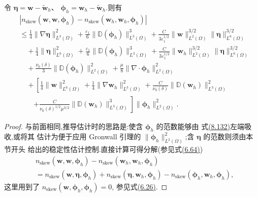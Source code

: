 \begin{lemma}[非线性对流项的估计]
\label{lem:smagorinsky-error-convective-term}
令 $\symbf{\eta}=\bm{w}-\widetilde{\bm{w}}_h$、
$\symbf{\phi}_h=\bm{w}_h-\widetilde{\bm{w}}_h$.则有
\begin{equation}\label{eq:smagorinsky-error-convection-estimate}
\begin{aligned}
&\left|n_{\mathrm{skew}}(\bm{w},\bm{w},\symbf{\phi}_h)
 -n_{\mathrm{skew}}(\bm{w}_h,\bm{w}_h,\symbf{\phi}_h)\right|\\
&\le \frac14\|\nabla\symbf{\eta}\|_{L^3(\Omega)}^2
 +\frac{\varepsilon_1}{6}
       \|\mathbb{D}(\symbf{\phi}_h)\|_{L^3(\Omega)}^3
 +\frac{C}{3\varepsilon_1^{1/2}}
       \|\bm{w}\|_{L^2(\Omega)}^{3/2}
       \|\symbf{\eta}\|_{L^6(\Omega)}^{3/2}\\
&\quad+\frac14\|\symbf{\eta}\|_{L^6(\Omega)}^2
 +\frac{\varepsilon_1}{6}
       \|\mathbb{D}(\symbf{\phi}_h)\|_{L^3(\Omega)}^3
 +\frac{C}{3\varepsilon_1^{1/2}}
       \|\bm{w}_h\|_{L^2(\Omega)}^{3/2}
       \|\symbf{\eta}\|_{L^6(\Omega)}^{3/2}\\
&\quad+\frac{\nu_0(\delta)}{3}
       \|\mathbb{D}(\symbf{\phi}_h)\|_{L^2(\Omega)}^2
 +\frac\mu8\|\nabla\cdot\symbf{\phi}_h\|_{L^2(\Omega)}^2\\
&\quad+\left[\frac14\|\bm{w}\|_{L^6(\Omega)}^2
 +\frac14\|\nabla\bm{w}_h\|_{L^3(\Omega)}^2
 +\frac{C}{\nu_0(\delta)}
       \|\mathbb{D}(\bm{w}_h)\|_{L^3(\Omega)}^2\right.\\
&\qquad\left.
 +\frac{C}{\nu_0(\delta)^{1/2}\mu^{3/2}}
       \|\mathbb{D}(\bm{w}_h)\|_{L^3(\Omega)}^3\right]
       \|\symbf{\phi}_h\|_{L^2(\Omega)}^2.
\end{aligned}
\end{equation}
\begin{proof}
与前面相同,推导估计时的思路是:使含 $\symbf{\phi}_h$ 的范数能够由
式\hyperref[eq:smagorinsky-error-equation-tested]{(8.132)}左端吸收,或将其
估计为便于应用 Gronwall 引理的
$\|\symbf{\phi}_h\|_{L^2(\Omega)}^2$;含 $\symbf{\eta}$ 的范数则须由本节开头
给出的稳定性估计控制.直接计算可得分解(参见式\hyperref[eq:steady-ns-error-convection-splitting]{(6.64)})
\begin{equation}\label{eq:smagorinsky-error-convection-decomposition}
\begin{aligned}
&n_{\mathrm{skew}}(\bm{w},\bm{w},\symbf{\phi}_h)
 -n_{\mathrm{skew}}(\bm{w}_h,\bm{w}_h,\symbf{\phi}_h)\\
&=n_{\mathrm{skew}}(\bm{w},\symbf{\eta},\symbf{\phi}_h)
 +n_{\mathrm{skew}}(\symbf{\eta},\bm{w}_h,\symbf{\phi}_h)
 -n_{\mathrm{skew}}(\symbf{\phi}_h,\bm{w}_h,\symbf{\phi}_h),
\end{aligned}
\end{equation}
这里用到了 $n_{\mathrm{skew}}(\bm{w},\symbf{\phi}_h,\symbf{\phi}_h)=0$,
参见式\hyperref[eq:steady-ns-convection-zero-rot-skew]{(6.26)}.


\end{proof}
\end{lemma}
